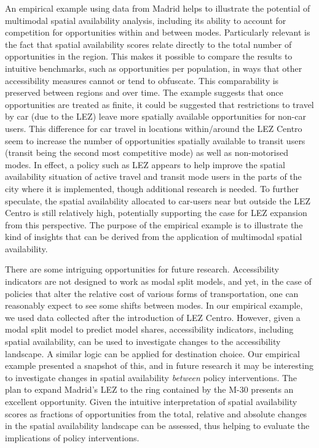 \documentclass[10pt,letterpaper]{article}
\begin{document}
An empirical example using data from Madrid helps to illustrate the
potential of multimodal spatial availability analysis, including its
ability to account for competition for opportunities within and between
modes. Particularly relevant is the fact that spatial availability
scores relate directly to the total number of opportunities in the
region. This makes it possible to compare the results to intuitive
benchmarks, such as opportunities per population, in ways that other
accessibility measures cannot or tend to obfuscate. This comparability
is preserved between regions and over time. The example suggests that
once opportunities are treated as finite, it could be suggested that
restrictions to travel by car (due to the LEZ) leave more spatially
available opportunities for non-car users. This difference for car
travel in locations within/around the LEZ Centro seem to increase the
number of opportunities spatially available to transit users (transit
being the second most competitive mode) as well as non-motorised modes.
In effect, a policy such as LEZ appears to help improve the spatial
availability situation of active travel and transit mode users in the
parts of the city where it is implemented, though additional research is
needed. To further speculate, the spatial availability allocated to
car-users near but outside the LEZ Centro is still relatively high,
potentially supporting the case for LEZ expansion from this perspective.
The purpose of the empirical example is to illustrate the kind of
insights that can be derived from the application of multimodal spatial
availability.

There are some intriguing opportunities for future research.
Accessibility indicators are not designed to work as modal split models,
and yet, in the case of policies that alter the relative cost of various
forms of transportation, one can reasonably expect to see some shifts
between modes. In our empirical example, we used data collected after
the introduction of LEZ Centro. However, given a modal split model to
predict model shares, accessibility indicators, including spatial
availability, can be used to investigate changes to the accessibility
landscape. A similar logic can be applied for destination choice. Our
empirical example presented a snapshot of this, and in future research
it may be interesting to investigate changes in spatial availability
\emph{between} policy interventions. The plan to expand Madrid's LEZ to
the ring contained by the M-30 presents an excellent opportunity. Given
the intuitive interpretation of spatial availability scores as fractions
of opportunities from the total, relative and absolute changes in the
spatial availability landscape can be assessed, thus helping to evaluate
the implications of policy interventions.
\end{document}
